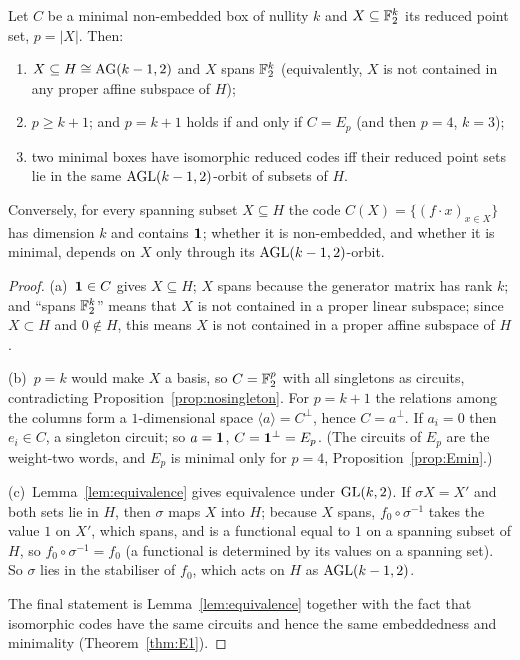 \begin{theorem}\label{thm:affine}
Let $C$ be a minimal non-embedded box of nullity $k$ and $X\subseteq\mathbb F_2^k$ its reduced point set, $p=|X|$. Then:
\begin{enumerate}[label=(\alph*)]
\item $X\subseteq H\cong\mathrm{AG}(k-1,2)$ and $X$ spans $\mathbb F_2^k$ (equivalently, $X$ is not contained in any proper affine subspace of $H$);
\item $p\ge k+1$; and $p=k+1$ holds if and only if $C=E_p$ (and then $p=4$, $k=3$);
\item two minimal boxes have isomorphic reduced codes iff their reduced point sets lie in the same $\mathrm{AGL}(k-1,2)$-orbit of subsets of $H$.
\end{enumerate}
Conversely, for every spanning subset $X\subseteq H$ the code $C(X)=\{(f\cdot x)_{x\in X}\}$ has dimension $k$ and contains $\mathbf 1$; whether it is non-embedded, and whether it is minimal, depends on $X$ only through its $\mathrm{AGL}(k-1,2)$-orbit.
\end{theorem}

\begin{proof}
(a)~$\mathbf 1\in C$ gives $X\subseteq H$; $X$ spans because the generator matrix has rank $k$; and ``spans $\mathbb F_2^k$'' means that $X$ is not contained in a proper linear subspace; since $X\subset H$ and $0\notin H$, this means $X$ is not contained in a proper affine subspace of $H$.

(b)~$p=k$ would make $X$ a basis, so $C=\mathbb F_2^p$ with all singletons as circuits, contradicting Proposition~\ref{prop:nosingleton}. For $p=k+1$ the relations among the columns form a $1$-dimensional space $\langle a\rangle=C^\perp$, hence $C=a^\perp$. If $a_i=0$ then $e_i\in C$, a singleton circuit; so $a=\mathbf 1$, $C=\mathbf 1^\perp=E_p$. (The circuits of $E_p$ are the weight-two words, and $E_p$ is minimal only for $p=4$, Proposition~\ref{prop:Emin}.)

(c)~Lemma~\ref{lem:equivalence} gives equivalence under $\mathrm{GL}(k,2)$. If $\sigma X=X'$ and both sets lie in $H$, then $\sigma$ maps $X$ into $H$; because $X$ spans, $f_0\circ\sigma^{-1}$ takes the value $1$ on $X'$, which spans, and is a functional equal to $1$ on a spanning subset of $H$, so $f_0\circ\sigma^{-1}=f_0$ (a functional is determined by its values on a spanning set). So $\sigma$ lies in the stabiliser of $f_0$, which acts on $H$ as $\mathrm{AGL}(k-1,2)$.

The final statement is Lemma~\ref{lem:equivalence} together with the fact that isomorphic codes have the same circuits and hence the same embeddedness and minimality (Theorem~\ref{thm:E1}).
\end{proof}

